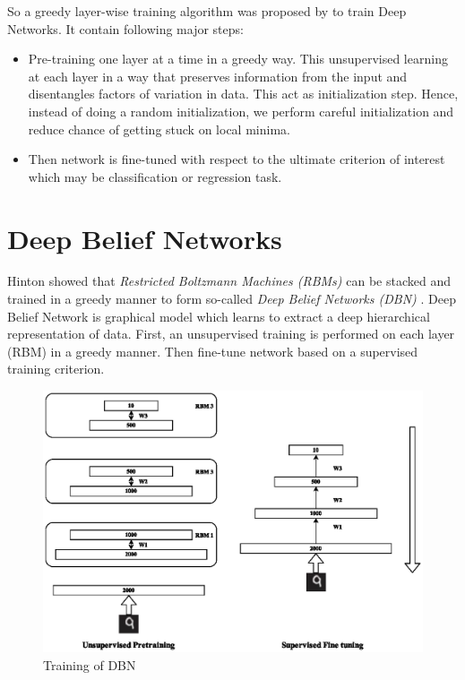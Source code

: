 So a greedy layer-wise training algorithm was proposed by \citet{hinton2006reducing} to train Deep Networks. It contain following major steps:
\begin{itemize}
\item Pre-training one layer at a time in a greedy way. This unsupervised learning at each layer in a way that preserves information from the input and disentangles factors of
variation in data. This act as initialization step. Hence, instead of doing a random initialization, we perform careful initialization and reduce chance of getting stuck on local minima.
\item Then network is fine-tuned with respect to the ultimate criterion of interest which may be classification or regression task.
\end{itemize}

\section{Deep Belief Networks}
Hinton showed that \emph{Restricted Boltzmann Machines (RBMs)} can be stacked and trained in a greedy manner to form so-called \emph{Deep Belief Networks (DBN)} \cite{hinton2006reducing}. Deep Belief Network is graphical model which learns to extract a deep hierarchical representation of data. First, an unsupervised training is performed on each layer (RBM) in a greedy manner. Then fine-tune network based on a supervised training criterion.
\begin{figure}[!ht]
\includegraphics[scale=1]{./imgs/RBM_Train.eps} 
\caption{Training of DBN}
\end{figure}

